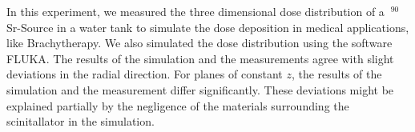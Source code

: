 \documentclass[a4paper,parskip]{scrartcl}
\begin{document}
In this experiment, we measured the three dimensional dose distribution of a $~^ {90}$Sr-Source in a water tank to simulate the dose deposition in medical applications, like Brachytherapy. We also simulated the dose distribution using the software FLUKA. The results of the simulation and the measurements agree with slight deviations in the radial direction. For planes of constant $z$, the results of the simulation and the measurement differ significantly. These deviations might be explained partially by the negligence of the materials surrounding the scinitallator in the simulation. 

\newpage


\end{document}
